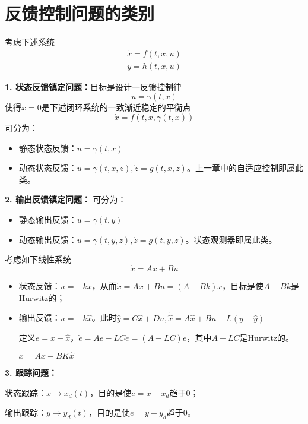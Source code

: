 \section{反馈控制问题的类别}\label{5Aref}
考虑下述系统
\begin{equation}
    \begin{aligned}
  \dot{x} = f (t, x, u)\\
  y = h (t, x, u)
\end{aligned}\label{sys:1}
\end{equation}

\textbf{1. 状态反馈镇定问题：}目标是设计一反馈控制律
\[ u = \gamma (t, x) \]
使得$x = 0$是下述闭环系统的一致渐近稳定的平衡点
\[ \dot{x} = f (t, x, \gamma (t, x)) \]
可分为：
\begin{itemize}[leftmargin=1em]
    \item 静态状态反馈：$u = \gamma (t, x)$
    \item 动态状态反馈：$u = \gamma (t, x, z), \dot{z} = g (t, x, z)$。上一章中的自适应控制即属此类。
\end{itemize}

\textbf{2. 输出反馈镇定问题：}
可分为：
\begin{itemize}[leftmargin=1em]
\item 静态输出反馈：$u = \gamma (t, y)$
\item 动态输出反馈：$u = \gamma (t, y, z), \dot{z} = g (t, y, z)$。状态观测器即属此类。
\end{itemize}

\begin{example}
  考虑如下线性系统
  \[ \dot{x} = A x + B u \]
 \begin{itemize}[leftmargin=1em]
  \item 状态反馈：$u = - k x$，从而$\dot{x} = A x + B u = (A - B k)
  x$，目标是使$A - B k$是Hurwitz的；
  
  \item 输出反馈：$u = - k \hat{x}$。此时$\hat{y} = C  \hat{x} + D  u,
  \dot{\hat{x}} = A  \hat{x} + B  u + L(y - \hat{y})$
  
  定义$e = x - \hat{x}$，$\dot{e} = A e - L C e = (A - L C) e$，其中$A - L C$是Hurwitz的。
  
  $\dot{x} = A x - B K \hat{x}$
  \end{itemize}
\end{example}

\textbf{3. 跟踪问题：}

状态跟踪：$x \rightarrow x_d (t)$，目的是使$e = x - x_d$趋于$0$；

输出跟踪：$y \rightarrow y_d (t)$，目的是使$e = y - y_d$趋于$0$。

